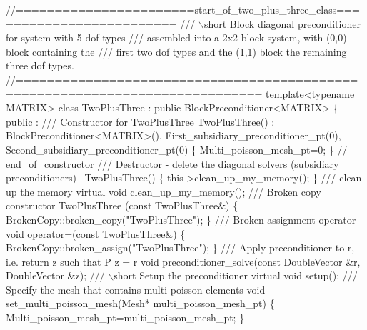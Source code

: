 \begin{DoxyCodeInclude}
\textcolor{comment}{//=======================start\_of\_two\_plus\_three\_class=========================}\textcolor{comment}{}
\textcolor{comment}{/// \(\backslash\)short Block diagonal preconditioner for system with 5 dof types}
\textcolor{comment}{/// assembled into a 2x2 block system, with (0,0) block containing the }
\textcolor{comment}{/// first two dof types and the (1,1) block the remaining three dof types.}
\textcolor{comment}{}\textcolor{comment}{//=============================================================================}
 \textcolor{keyword}{template}<\textcolor{keyword}{typename} MATRIX> 
 \textcolor{keyword}{class }TwoPlusThree : \textcolor{keyword}{public} BlockPreconditioner<MATRIX>
  \{
    public :
   \textcolor{comment}{}
\textcolor{comment}{  /// Constructor for TwoPlusThree}
\textcolor{comment}{}  TwoPlusThree() : BlockPreconditioner<MATRIX>(),
   First\_subsidiary\_preconditioner\_pt(0),
   Second\_subsidiary\_preconditioner\_pt(0)
    \{
     Multi\_poisson\_mesh\_pt=0;
    \} \textcolor{comment}{// end\_of\_constructor}
    \textcolor{comment}{}
\textcolor{comment}{  /// Destructor - delete the diagonal solvers (subsidiary preconditioners)}
\textcolor{comment}{}  ~TwoPlusThree()
   \{
    this->clean\_up\_my\_memory();
   \}\textcolor{comment}{}
\textcolor{comment}{  /// clean up the memory}
\textcolor{comment}{}  \textcolor{keyword}{virtual} \textcolor{keywordtype}{void} clean\_up\_my\_memory();
\textcolor{comment}{}
\textcolor{comment}{  /// Broken copy constructor}
\textcolor{comment}{}  TwoPlusThree
  (\textcolor{keyword}{const} TwoPlusThree&) 
   \{ 
    BrokenCopy::broken\_copy(\textcolor{stringliteral}{"TwoPlusThree"});
   \} 
  \textcolor{comment}{}
\textcolor{comment}{  /// Broken assignment operator}
\textcolor{comment}{}  \textcolor{keywordtype}{void} operator=(\textcolor{keyword}{const} TwoPlusThree&) 
   \{
    BrokenCopy::broken\_assign(\textcolor{stringliteral}{"TwoPlusThree"});
   \}
  \textcolor{comment}{}
\textcolor{comment}{  /// Apply preconditioner to r, i.e. return z such that P z = r}
\textcolor{comment}{}  \textcolor{keywordtype}{void} preconditioner\_solve(\textcolor{keyword}{const} DoubleVector &r, DoubleVector &z);
  \textcolor{comment}{}
\textcolor{comment}{  /// \(\backslash\)short Setup the preconditioner }
\textcolor{comment}{}  \textcolor{keyword}{virtual} \textcolor{keywordtype}{void} setup();
 \textcolor{comment}{}
\textcolor{comment}{  /// Specify the mesh that contains multi-poisson elements}
\textcolor{comment}{}  \textcolor{keywordtype}{void} set\_multi\_poisson\_mesh(Mesh* multi\_poisson\_mesh\_pt)
  \{
   Multi\_poisson\_mesh\_pt=multi\_poisson\_mesh\_pt;
  \}


\end{DoxyCodeInclude}
